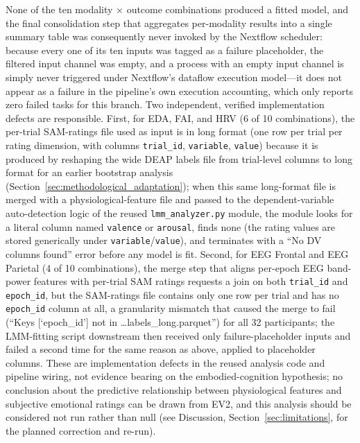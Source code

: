 None of the ten modality $\times$ outcome combinations produced a fitted model, and the final consolidation step that aggregates per-modality results into a single summary table was consequently never invoked by the Nextflow scheduler: because every one of its ten inputs was tagged as a failure placeholder, the filtered input channel was empty, and a process with an empty input channel is simply never triggered under Nextflow's dataflow execution model---it does not appear as a failure in the pipeline's own execution accounting, which only reports zero failed tasks for this branch. Two independent, verified implementation defects are responsible. First, for EDA, \gls{FAI}, and \gls{HRV} (6 of 10 combinations), the per-trial SAM-ratings file used as input is in long format (one row per trial per rating dimension, with columns \texttt{trial\_id}, \texttt{variable}, \texttt{value}) because it is produced by reshaping the wide DEAP labels file from trial-level columns to long format for an earlier bootstrap analysis (Section~\ref{sec:methodological_adaptation}); when this same long-format file is merged with a physiological-feature file and passed to the dependent-variable auto-detection logic of the reused \texttt{lmm\_analyzer.py} module, the module looks for a literal column named \texttt{valence} or \texttt{arousal}, finds none (the rating values are stored generically under \texttt{variable}/\texttt{value}), and terminates with a ``No DV columns found'' error before any model is fit. Second, for EEG Frontal and EEG Parietal (4 of 10 combinations), the merge step that aligns per-epoch EEG band-power features with per-trial SAM ratings requests a join on both \texttt{trial\_id} and \texttt{epoch\_id}, but the SAM-ratings file contains only one row per trial and has no \texttt{epoch\_id} column at all, a granularity mismatch that caused the merge to fail (``Keys [`epoch\_id'] not in \dots labels\_long.parquet'') for all 32 participants; the LMM-fitting script downstream then received only failure-placeholder inputs and failed a second time for the same reason as above, applied to placeholder columns. These are implementation defects in the reused analysis code and pipeline wiring, not evidence bearing on the embodied-cognition hypothesis; no conclusion about the predictive relationship between physiological features and subjective emotional ratings can be drawn from EV2, and this analysis should be considered not run rather than null (see Discussion, Section~\ref{sec:limitations}, for the planned correction and re-run).

